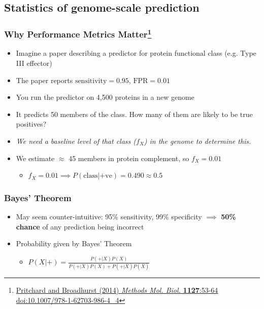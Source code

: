


\subsection{Statistics of genome-scale prediction}
\begin{frame}
  \frametitle{Why Performance Metrics Matter\footnote{\tiny{\href{http://dx.doi.org/10.1007/978-1-62703-986-4_4}{Pritchard and Broadhurst (2014) \textit{Methods Mol. Biol.} \textbf{1127}:53-64 doi:10.1007/978-1-62703-986-4\_4}}}}
  \begin{itemize}
    \item<1-> Imagine a paper describing a predictor for protein functional class (e.g. Type III effector)
    \item<1-> The paper reports \textbf{$\text{sensitivity}=0.95$}, \textbf{$\text{FPR}=0.01$}
    \item<1-> You run the predictor on 4,500 proteins in a new genome
    \item<1-> It predicts 50 members of the class. How many of them are likely to be true positives?
    \item<2-> \textit{We need a baseline level of that class ($f_X$) in the genome to determine this.}        
    \item<2-> We estimate $\approx$ 45 members in protein complement, so $f_X=0.01$
    \begin{itemize}
      \item $f_X = 0.01 \implies P(\text{class}|\text{+ve}) = 0.490 \approx 0.5$
    \end{itemize}
  \end{itemize} 
\end{frame}

\begin{frame}
  \frametitle{Bayes' Theorem}
  \begin{itemize}
    \item May seem counter-intuitive: 95\% sensitivity, 99\% specificity $\implies$ \textbf{50\% chance} of any prediction being incorrect
    \item Probability given by Bayes' Theorem
    \begin{itemize}
      \item $P(X|+) =  \frac{P(+|X) P(X)}{P(+|X) P(X) + P(+|\bar{X}) P(\bar{X})}$
    \end{itemize}
  \end{itemize} 
\end{frame}

